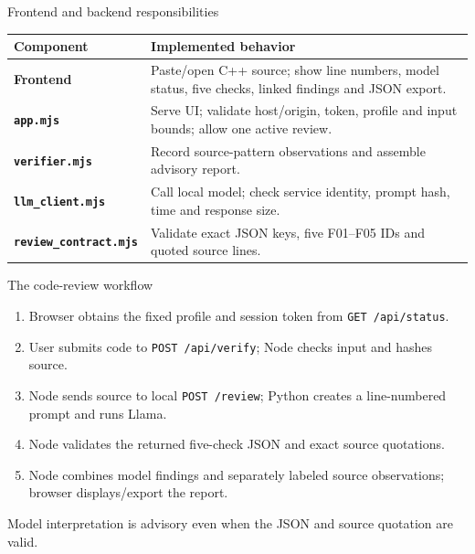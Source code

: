 \documentclass[aspectratio=169,10pt]{beamer}
\begin{document}
\begin{frame}{Frontend and backend responsibilities}
\small
\begin{tabularx}{\textwidth}{>{\bfseries}p{3.1cm}X}
\toprule
Component & Implemented behavior \\
\midrule
Frontend & Paste/open C++ source; show line numbers, model status, five checks, linked findings and JSON export. \\
\texttt{app.mjs} & Serve UI; validate host/origin, token, profile and input bounds; allow one active review. \\
\texttt{verifier.mjs} & Record source-pattern observations and assemble advisory report. \\
\texttt{llm\_client.mjs} & Call local model; check service identity, prompt hash, time and response size. \\
\texttt{review\_contract.mjs} & Validate exact JSON keys, five F01--F05 IDs and quoted source lines. \\
\bottomrule
\end{tabularx}
\end{frame}

\begin{frame}{The code-review workflow}
\begin{enumerate}
\item Browser obtains the fixed profile and session token from \texttt{GET /api/status}.
\item User submits code to \texttt{POST /api/verify}; Node checks input and hashes source.
\item Node sends source to local \texttt{POST /review}; Python creates a line-numbered prompt and runs Llama.
\item Node validates the returned five-check JSON and exact source quotations.
\item Node combines model findings and separately labeled source observations; browser displays/export the report.
\end{enumerate}
\vspace{0.4em}
\alert{Model interpretation is advisory even when the JSON and source quotation are valid.}
\end{frame}
\end{document}
